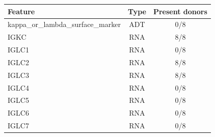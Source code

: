 \begin{tabular}{lcc}
\toprule
Feature & Type & Present donors \\
\midrule
kappa\_or\_lambda\_surface\_marker & ADT & 0/8 \\
IGKC & RNA & 8/8 \\
IGLC1 & RNA & 0/8 \\
IGLC2 & RNA & 8/8 \\
IGLC3 & RNA & 8/8 \\
IGLC4 & RNA & 0/8 \\
IGLC5 & RNA & 0/8 \\
IGLC6 & RNA & 0/8 \\
IGLC7 & RNA & 0/8 \\
\bottomrule
\end{tabular}
